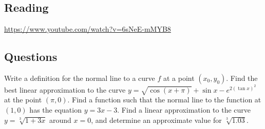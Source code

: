 


\subsection*{Reading}
\begin{center}
\begin{tcolorbox}[width=0.8\textwidth,colback={red},title={\textbf{Go and watch...}},colbacktitle=yellow,coltitle=blue]
  \textcolor{white}{\url{https://www.youtube.com/watch?v=6sNeE-mMYB8}}
\end{tcolorbox}
\end{center}

\subsection*{Questions}
\begin{questions}
  \question Write a definition for the normal line to a curve $ f $ at a point $ (x_0, y_0) $.
  \question Find the best linear approximation to the curve $ y = \sqrt{\cos(x + \pi)} + \sin x - e^{2(\tan x)^2} $ at the point $ (\pi, 0) $.
  \question Find a function such that the normal line to the function at $ (1,0) $ has the equation $ y = 3x - 3 $.
  \question Find a linear approximation to the curve $ y = \sqrt[3]{1 + 3x} $ around $ x = 0 $, and determine an approximate value for $ \sqrt[3]{1.03} $.
\end{questions}


